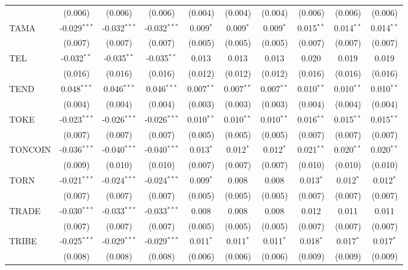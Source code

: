 \begin{table}[!htbp]
\begin{tabular}{@{\extracolsep{5pt}}lccccccccc}
  & (0.006) & (0.006) & (0.006) & (0.004) & (0.004) & (0.004) & (0.006) & (0.006) & (0.006) \\
 TAMA & -0.029$^{***}$ & -0.032$^{***}$ & -0.032$^{***}$ & 0.009$^{*}$ & 0.009$^{*}$ & 0.009$^{*}$ & 0.015$^{**}$ & 0.014$^{**}$ & 0.014$^{**}$ \\
  & (0.007) & (0.007) & (0.007) & (0.005) & (0.005) & (0.005) & (0.007) & (0.007) & (0.007) \\
 TEL & -0.032$^{**}$ & -0.035$^{**}$ & -0.035$^{**}$ & 0.013$^{}$ & 0.013$^{}$ & 0.013$^{}$ & 0.020$^{}$ & 0.019$^{}$ & 0.019$^{}$ \\
  & (0.016) & (0.016) & (0.016) & (0.012) & (0.012) & (0.012) & (0.016) & (0.016) & (0.016) \\
 TEND & 0.048$^{***}$ & 0.046$^{***}$ & 0.046$^{***}$ & 0.007$^{**}$ & 0.007$^{**}$ & 0.007$^{**}$ & 0.010$^{**}$ & 0.010$^{**}$ & 0.010$^{**}$ \\
  & (0.004) & (0.004) & (0.004) & (0.003) & (0.003) & (0.003) & (0.004) & (0.004) & (0.004) \\
 TOKE & -0.023$^{***}$ & -0.026$^{***}$ & -0.026$^{***}$ & 0.010$^{**}$ & 0.010$^{**}$ & 0.010$^{**}$ & 0.016$^{**}$ & 0.015$^{**}$ & 0.015$^{**}$ \\
  & (0.007) & (0.007) & (0.007) & (0.005) & (0.005) & (0.005) & (0.007) & (0.007) & (0.007) \\
 TONCOIN & -0.036$^{***}$ & -0.040$^{***}$ & -0.040$^{***}$ & 0.013$^{*}$ & 0.012$^{*}$ & 0.012$^{*}$ & 0.021$^{**}$ & 0.020$^{**}$ & 0.020$^{**}$ \\
  & (0.009) & (0.010) & (0.010) & (0.007) & (0.007) & (0.007) & (0.010) & (0.010) & (0.010) \\
 TORN & -0.021$^{***}$ & -0.024$^{***}$ & -0.024$^{***}$ & 0.009$^{*}$ & 0.008$^{}$ & 0.008$^{}$ & 0.013$^{*}$ & 0.012$^{*}$ & 0.012$^{*}$ \\
  & (0.007) & (0.007) & (0.007) & (0.005) & (0.005) & (0.005) & (0.007) & (0.007) & (0.007) \\
 TRADE & -0.030$^{***}$ & -0.033$^{***}$ & -0.033$^{***}$ & 0.008$^{}$ & 0.008$^{}$ & 0.008$^{}$ & 0.012$^{}$ & 0.011$^{}$ & 0.011$^{}$ \\
  & (0.007) & (0.007) & (0.007) & (0.005) & (0.005) & (0.005) & (0.007) & (0.007) & (0.007) \\
 TRIBE & -0.025$^{***}$ & -0.029$^{***}$ & -0.029$^{***}$ & 0.011$^{*}$ & 0.011$^{*}$ & 0.011$^{*}$ & 0.018$^{*}$ & 0.017$^{*}$ & 0.017$^{*}$ \\
  & (0.008) & (0.008) & (0.008) & (0.006) & (0.006) & (0.006) & (0.009) & (0.009) & (0.009) \\

\end{tabular}
\end{table}
